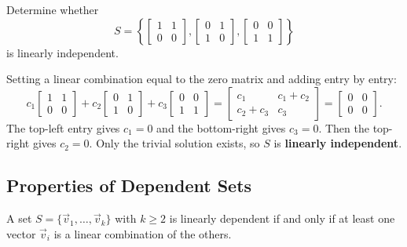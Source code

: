 \begin{example}
Determine whether
\[
S = \left\{ \begin{bmatrix} 1 & 1 \\ 0 & 0 \end{bmatrix}, \begin{bmatrix} 0 & 1 \\ 1 & 0 \end{bmatrix}, \begin{bmatrix} 0 & 0 \\ 1 & 1 \end{bmatrix} \right\}
\]
is linearly independent.

\begin{solution}
Setting a linear combination equal to the zero matrix and adding entry by entry:
\[
c_1 \begin{bmatrix} 1 & 1 \\ 0 & 0 \end{bmatrix} + c_2 \begin{bmatrix} 0 & 1 \\ 1 & 0 \end{bmatrix} + c_3 \begin{bmatrix} 0 & 0 \\ 1 & 1 \end{bmatrix}
= \begin{bmatrix} c_1 & c_1 + c_2 \\ c_2 + c_3 & c_3 \end{bmatrix}
= \begin{bmatrix} 0 & 0 \\ 0 & 0 \end{bmatrix}.
\]
The top-left entry gives $c_1 = 0$ and the bottom-right gives $c_3 = 0$. Then the top-right gives $c_2 = 0$. Only the trivial solution exists, so $S$ is \textbf{linearly independent}.
\end{solution}
\end{example}

\subsection{Properties of Dependent Sets}

\begin{theorem}\label{thm:L2-dep}
A set $S = \{\vec{v}_1, \dots, \vec{v}_k\}$ with $k \ge 2$ is linearly dependent if and only if at least one vector $\vec{v}_i$ is a linear combination of the others.
\end{theorem}

